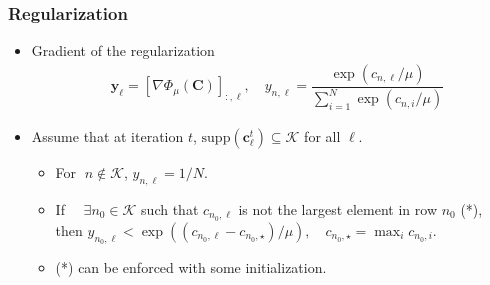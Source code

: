 \documentclass[10pt,xcolor={usenames,dvipsnames,table}]{beamer}
\newcommand{\T}{\!\top\!}
\begin{document}
\begin{frame}[label=current]
\end{frame}

\begin{frame}[label=current]
    \frametitle{Regularization}
    \begin{itemize}
        \item Gradient of the regularization 
\begin{align*} 
    &\bm{y}_\ell = [\nabla \varPhi_{\mu}(\bm{C})]_{:, \ell} , \quad 
    y_{n,\ell} = \dfrac{\exp (c_{n, \ell}/\mu)}{\sum^{N}_{i=1} \exp(c_{n, i}/\mu)} 
\end{align*}
        \item Assume that at iteration $t$,  $\text{supp}(\bm{c}^{t}_\ell) \subseteq \mathcal{K}$ for all $\ell$.
\begin{itemize}
    \item For $\; n \notin \mathcal{K}$,
        $ y_{n, \ell} = 1/N$. 
    \item If $\quad \exists n_0 \in \mathcal{K}$ such that $c_{n_0, \ell}$ is not the largest element in row $n_0$ (*), then
    $ y_{n_0, \ell} < \exp ((c_{n_0, \ell} - c_{n_0, \star})/\mu), \quad c_{n_0, \star} = \max_{i} c_{n_0, i} $.
\item (*) can be enforced with some initialization.
\end{itemize}


\end{itemize}
\end{frame}
\end{document}
